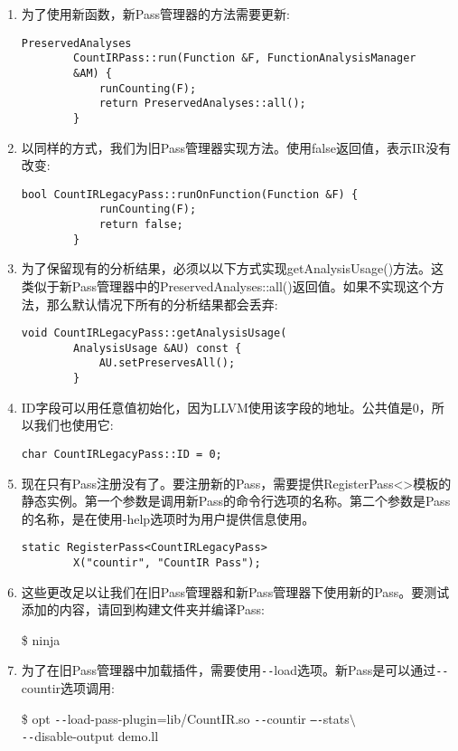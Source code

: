 \begin{enumerate}
	\item 为了使用新函数，新Pass管理器的方法需要更新:
	\begin{lstlisting}[caption={}]
		PreservedAnalyses
		CountIRPass::run(Function &F, FunctionAnalysisManager 
		&AM) {
			runCounting(F);
			return PreservedAnalyses::all();
		}
	\end{lstlisting}
	
	\item 以同样的方式，我们为旧Pass管理器实现方法。使用false返回值，表示IR没有改变:
	\begin{lstlisting}[caption={}]
		bool CountIRLegacyPass::runOnFunction(Function &F) {
			runCounting(F);
			return false;
		}
	\end{lstlisting}
	
	\item 为了保留现有的分析结果，必须以以下方式实现getAnalysisUsage()方法。这类似于新Pass管理器中的PreservedAnalyses::all()返回值。如果不实现这个方法，那么默认情况下所有的分析结果都会丢弃:
	\begin{lstlisting}[caption={}]
		void CountIRLegacyPass::getAnalysisUsage(
		AnalysisUsage &AU) const {
			AU.setPreservesAll();
		}
	\end{lstlisting}
	
	\item ID字段可以用任意值初始化，因为LLVM使用该字段的地址。公共值是0，所以我们也使用它:
	\begin{lstlisting}[caption={}]
		char CountIRLegacyPass::ID = 0;
	\end{lstlisting}
	
	\item 现在只有Pass注册没有了。要注册新的Pass，需要提供RegisterPass<>模板的静态实例。第一个参数是调用新Pass的命令行选项的名称。第二个参数是Pass的名称，是在使用-help选项时为用户提供信息使用。
	\begin{lstlisting}[caption={}]
		static RegisterPass<CountIRLegacyPass>
		X("countir", "CountIR Pass");
	\end{lstlisting}
	
	\item 这些更改足以让我们在旧Pass管理器和新Pass管理器下使用新的Pass。要测试添加的内容，请回到构建文件夹并编译Pass:
	\begin{tcolorbox}[colback=white,colframe=black]
		\$ ninja
	\end{tcolorbox}
	
	\item 为了在旧Pass管理器中加载插件，需要使用\verb|--|load选项。新Pass是可以通过\verb|--|countir选项调用:
	\begin{tcolorbox}[colback=white,colframe=black]
		\$ opt \verb|--|load-pass-plugin=lib/CountIR.so \verb|--|countir \verb|–-|stats$\setminus$ \\
		\hspace*{0.5cm}\verb|--|disable-output demo.ll
	\end{tcolorbox}
	

\end{enumerate}
